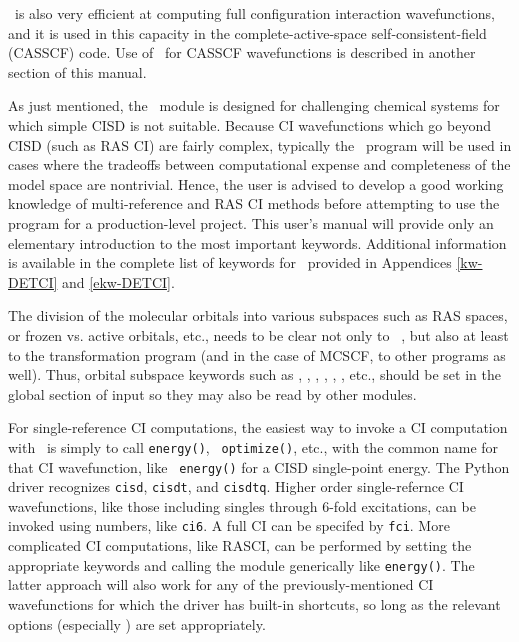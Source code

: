 \PSIdetci\ is also very efficient at computing full configuration interaction
wavefunctions, and it is used in this capacity in the complete-active-space
self-consistent-field (CASSCF) code.  Use of \PSIdetci\ for CASSCF
wavefunctions is described in another section of this manual.

As just mentioned, the \PSIdetci\ module is designed for challenging 
chemical systems for which simple CISD is not suitable.  Because
CI wavefunctions which go beyond CISD (such as RAS CI) are fairly complex,
typically the \PSIdetci\ program will be used in cases where the 
tradeoffs between computational expense and completeness of the 
model space are nontrivial.  Hence, the user is advised to develop
a good working knowledge of multi-reference and RAS CI methods before
attempting to use the program for a production-level project.  This user's
manual will provide only an elementary introduction to the most
important keywords.  Additional information is available in the complete
list of keywords for \PSIdetci\ provided in Appendices \ref{kw-DETCI} and \ref{ekw-DETCI}.

The division of the molecular orbitals into various subspaces such as
RAS spaces, or frozen vs. active orbitals, etc., needs to be clear not
only to \PSIdetci\ , but also at least to the transformation program
(and in the case of MCSCF, to other programs as well).  Thus, orbital
subspace keywords such as , , , 
, , , etc., should be set
in the global section of input so they may also be read by other modules.

For single-reference CI computations, the easiest way to invoke a CI
computation with \PSIdetci\ is simply to call {\tt energy()}, {\tt
optimize()}, etc., with the common name for that CI wavefunction, like {\tt
energy(\qq)} for a CISD single-point energy.  The Python driver
recognizes {\tt cisd}, {\tt cisdt}, and {\tt cisdtq}.  Higher order
single-refernce CI wavefunctions, like those including singles through
6-fold excitations, can be invoked using numbers, like {\tt ci6}.  A full
CI can be specifed by {\tt fci}.  More complicated CI computations, like
RASCI, can be performed by setting the appropriate keywords and calling the
module generically like {\tt energy(\qq)}.  The latter approach
will also work for any of the previously-mentioned CI wavefunctions for
which the driver has built-in shortcuts, so long as the relevant options
(especially ) are set appropriately.


